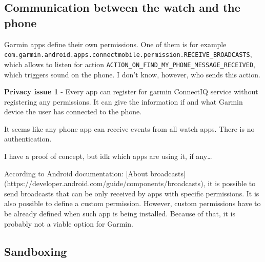 \subsection{Communication between the watch and the phone} \label{subsec:communication-watch-phone}

Garmin apps define their own permissions.
One of them is for example \verb|com.garmin.android.apps.connectmobile.permission.RECEIVE_BROADCASTS|, which allows to listen for action \verb|ACTION_ON_FIND_MY_PHONE_MESSAGE_RECEIVED|, which triggers sound on the phone.
I don't know, however, who sends this action.

\textbf{Privacy issue 1} - Every app can register for garmin ConnectIQ service without registering any permissions.
It can give the information if and what Garmin device the user has connected to the phone.

It seems like any phone app can receive events from all watch apps.
There is no authentication.

I have a proof of concept, but idk which apps are using it, if any\ldots

According to Android documentation: [About broadcasts](https://developer.android.com/guide/components/broadcasts),
it is possible to send broadcasts that can be only received by apps with specific permissions.
It is also possible to define a custom permission.
However, custom permissions have to be already defined when such app is being installed.
Because of that, it is probably not a viable option for Garmin.


\subsection{Sandboxing}